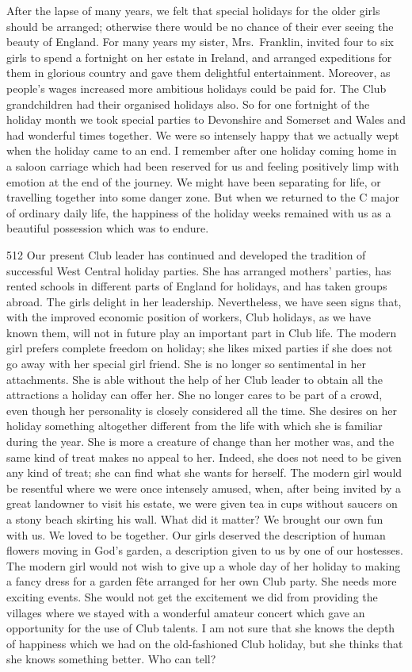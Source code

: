 After the lapse of many years, we felt that special
holidays for the older girls should be arranged; otherwise
there would be no chance of their ever seeing the beauty
of England. For many years my sister, Mrs.\ Franklin,
invited four to six girls to spend a fortnight on her
estate in Ireland, and arranged expeditions for them in
glorious country and gave them delightful entertainment.
Moreover, as people’s wages increased more ambitious
holidays could be paid for. The Club grandchildren had
their organised holidays also. So for one fortnight of the
holiday month we took special parties to Devonshire and
Somerset and Wales and had wonderful times together.
We were so intensely happy that we actually wept when
the holiday came to an end. I remember after one holiday
coming home in a saloon carriage which had been
reserved for us and feeling positively limp with emotion
at the end of the journey. We might have been separating
for life, or travelling together into some danger zone.
But when we returned to the C major of ordinary daily
life, the happiness of the holiday weeks remained with us
as a beautiful possession which was to endure.

\begin{tp}{512}
Our present Club leader has continued and developed
the tradition of successful West Central holiday parties.
She has arranged mothers’ parties, has rented schools in
different parts of England for holidays, and has taken
groups abroad. The girls delight in her leadership.
Nevertheless, we have seen signs that, with the improved
economic position of workers, Club holidays, as we have
known them, will not in future play an important part
in Club life. The modern girl prefers complete freedom
on holiday; she likes mixed parties if she does not go
away with her special girl friend. She is no longer so
sentimental in her attachments. She is able without the
help of her Club leader to obtain all the attractions a
holiday can offer her. She no longer cares to be part of a
crowd, even though her personality is closely considered
all the time. She desires on her holiday
something altogether different from the life with
which she is familiar during the year. She is more a
creature of change than her mother was, and the same
kind of treat makes no appeal to her. Indeed, she does
not need to be given any kind of treat; she can find what
she wants for herself. The modern girl would be resentful
where we were once intensely amused, when, after
being invited by a great landowner to visit his estate, we
were given tea in cups without saucers on a stony beach
skirting his wall. What did it matter? We brought our
own fun with us. We loved to be together. Our girls
deserved the description of human flowers moving in
God’s garden, a description given to us by one of our
hostesses. The modern girl would not wish to give up a
whole day of her holiday to making a fancy dress for a
garden fête arranged for her own Club party. She needs
more exciting events. She would not get the excitement
we did from providing the villages where we stayed with
a wonderful amateur concert which gave an opportunity
for the use of Club talents. I am not sure that she knows
the depth of happiness which we had on the old-fashioned
Club holiday, but she thinks that she knows something
better. Who can tell?
\end{tp}
